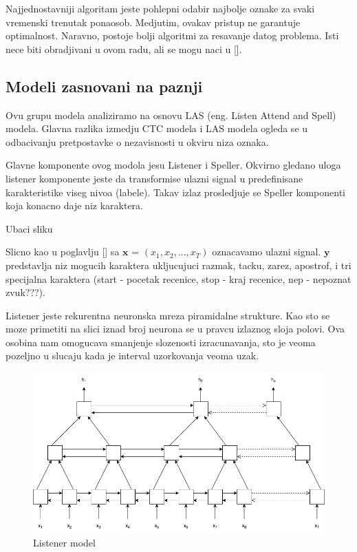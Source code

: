 \documentclass[a4paper]{article}
\begin{document}
Najjednostavniji algoritam jeste pohlepni odabir najbolje oznake za svaki vremenski trenutak ponaosob.  Medjutim, ovakav pristup ne garantuje optimalnost.  Naravno,  postoje bolji algoritmi za resavanje datog problema. Isti nece biti obradjivani u ovom radu, ali se mogu naci u [].

\subsection{Modeli zasnovani na paznji}

Ovu grupu modela analiziramo na osnovu LAS (eng.  Listen Attend and Spell) modela.  Glavna razlika izmedju CTC modela i LAS modela ogleda se u odbacivanju pretpostavke o nezavisnosti u okviru niza oznaka.  

\bigskip
Glavne komponente ovog modola jesu Listener i Speller.  Okvirno gledano uloga listener komponente jeste da transformise ulazni signal u predefinisane karakteristike viseg nivoa (labele).  Takav izlaz prosledjuje se Speller komponenti koja konacno daje niz karaktera. 

\bigskip
Ubaci sliku

\bigskip

Slicno kao u poglavlju [] sa $\textbf{x}$ = $(x_1,  x_2,  ...,  x_T)$ oznacavamo ulazni signal.  $\textbf{y}$ predstavlja niz mogucih karaktera ukljucujuci razmak,  tacku,  zarez,  apostrof,  i tri specijalna karaktera (start - pocetak recenice,  stop - kraj recenice,  nep - nepoznat zvuk???).

\bigskip

Listener jeste rekurentna neuronska mreza piramidalne strukture.  Kao sto se moze primetiti na slici iznad broj neurona se u pravcu izlaznog sloja polovi.  Ova osobina nam omogucava smanjenje slozenosti izracunavanja,  sto je veoma pozeljno u slucaju kada je interval uzorkovanja veoma uzak.

\begin{figure}[h!]
  \begin{center}
    \includegraphics[scale=0.3]{listener.png}
  \end{center}
  \caption{Listener model}
  \label{fig:listener_model}
\end{figure}
\end{document}
